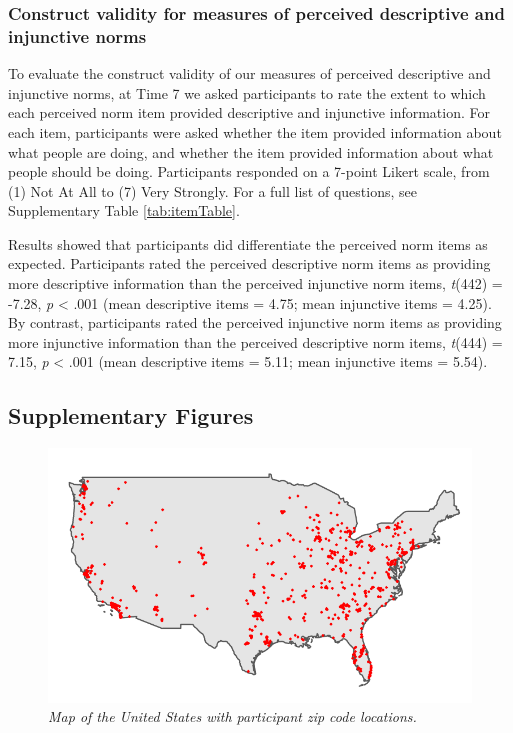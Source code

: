 \documentclass[
  man,floatsintext]{apa6}
\begin{document}
\hypertarget{construct-validity-for-measures-of-perceived-descriptive-and-injunctive-norms}{%
\subsubsection{Construct validity for measures of perceived descriptive and injunctive norms}\label{construct-validity-for-measures-of-perceived-descriptive-and-injunctive-norms}}

To evaluate the construct validity of our measures of perceived descriptive and injunctive norms, at Time 7 we asked participants to rate the extent to which each perceived norm item provided descriptive and injunctive information. For each item, participants were asked whether the item provided information about what people are doing, and whether the item provided information about what people should be doing. Participants responded on a 7-point Likert scale, from (1) Not At All to (7) Very Strongly. For a full list of questions, see Supplementary Table \ref{tab:itemTable}.

Results showed that participants did differentiate the perceived norm items as expected. Participants rated the perceived descriptive norm items as providing more descriptive information than the perceived injunctive norm items, \emph{t}(442) = -7.28, \emph{p} \textless{} .001 (mean descriptive items = 4.75; mean injunctive items = 4.25). By contrast, participants rated the perceived injunctive norm items as providing more injunctive information than the perceived descriptive norm items, \emph{t}(444) = 7.15, \emph{p} \textless{} .001 (mean descriptive items = 5.11; mean injunctive items = 5.54).

\newpage

\hypertarget{supplementary-figures}{%
\subsection{Supplementary Figures}\label{supplementary-figures}}



\begin{figure}
\centering
\includegraphics{manuscript_files/figure-latex/plotUSMap-1.pdf}
\caption{\label{fig:plotUSMap}\emph{Map of the United States with participant zip code locations.}}
\end{figure}
\end{document}
